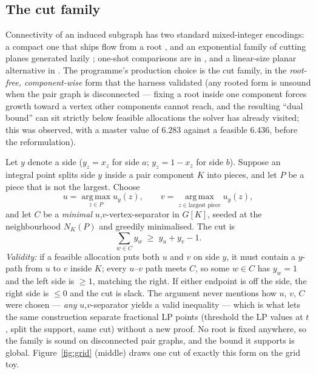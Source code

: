 \documentclass[11pt]{article}
\theoremstyle{definition}
\begin{document}
\subsection{The cut family}\label{sec:cuts}

Connectivity of an induced subgraph has two standard mixed-integer encodings: a compact
one that ships flow from a root \citep{shirabe2005}, and an exponential family of
cutting planes generated lazily \citep{validi2021,validibuchanan2022}; one-shot
comparisons are in \citet{duque2011}, and a linear-size planar alternative in
\citet{zhang2024}. The programme's production choice is the cut family, in the
\emph{root-free, component-wise} form that the harness validated (any rooted form is
unsound when the pair graph is disconnected --- fixing a root inside one component
forces growth toward a vertex other components cannot reach, and the resulting ``dual
bound'' can sit strictly below feasible allocations the solver has already visited;
this was observed, with a master value of $6.283$ against a feasible $6.436$, before
the reformulation).

Let $y$ denote a side ($y_z=x_z$ for side $a$; $y_z=1-x_z$ for side $b$). Suppose an
integral point splits side $y$ inside a pair component $K$ into pieces, and let $P$ be a
piece that is not the largest. Choose
\begin{equation*}
u=\operatorname*{arg\,max}_{z\in P} u_y(z),
\qquad
v=\operatorname*{arg\,max}_{z\in \text{largest piece}} u_y(z),
\end{equation*}
and let $C$ be a \emph{minimal} $u$,$v$-vertex-separator in $G[K]$, seeded at the
neighbourhood $N_K(P)$ and greedily minimalised. The cut is
\begin{equation}\label{eq:sepcut}
\sum_{w\in C} y_w \;\ge\; y_u + y_v - 1 .
\end{equation}
\emph{Validity:} if a feasible allocation puts both $u$ and $v$ on side $y$, it must
contain a $y$-path from $u$ to $v$ inside $K$; every $u$--$v$ path meets $C$, so some
$w\in C$ has $y_w=1$ and the left side is $\ge 1$, matching the right. If either
endpoint is off the side, the right side is $\le 0$ and the cut is slack. The argument
never mentions how $u$, $v$, $C$ were chosen --- \emph{any} $u$,$v$-separator yields a
valid inequality --- which is what lets the same construction separate fractional LP
points (threshold the LP values at $t$, split the support, same cut) without a new
proof. No root is fixed anywhere, so the family is sound on disconnected pair graphs,
and the bound it supports is global. Figure~\ref{fig:grid} (middle) draws one cut of
exactly this form on the grid toy.
\end{document}
